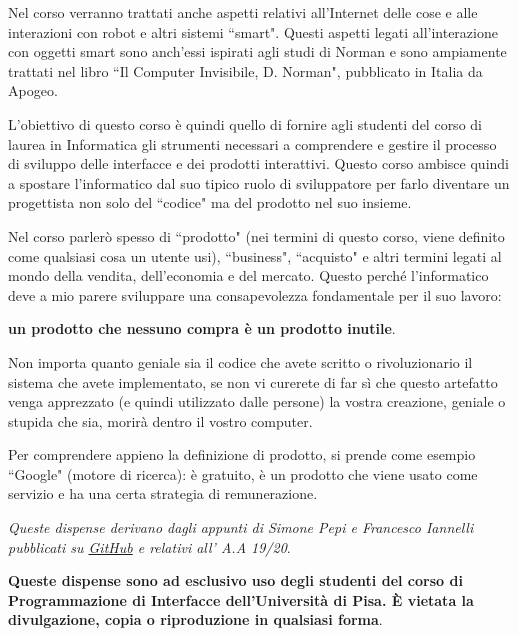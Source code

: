 Nel corso verranno trattati anche aspetti relativi all'Internet delle cose e alle interazioni con robot e altri sistemi ``smart". Questi aspetti
legati all'interazione con oggetti smart sono anch'essi ispirati agli studi di Norman e sono ampiamente trattati nel libro
``Il Computer Invisibile, D. Norman", pubblicato in Italia da Apogeo.

L'obiettivo di questo corso \`e quindi quello di fornire agli studenti del corso di laurea in Informatica gli strumenti necessari a comprendere e
gestire il processo di sviluppo delle interfacce e dei prodotti interattivi. Questo corso ambisce quindi a spostare l'informatico dal suo tipico
ruolo di sviluppatore per farlo diventare un progettista non solo del ``codice" ma del prodotto nel suo insieme.

Nel corso parler\`o spesso di ``prodotto" (nei termini di questo corso, viene definito come qualsiasi cosa un utente usi), ``business",
``acquisto" e altri termini legati al mondo della vendita, dell'economia e del mercato. Questo perch\'e l'informatico deve a mio parere sviluppare
una consapevolezza fondamentale per il suo lavoro:

\vspace{\baselineskip}
\textbf{un prodotto che nessuno compra \`e un prodotto inutile}.
\vspace{\baselineskip}

Non importa quanto geniale sia il codice che avete scritto o rivoluzionario il sistema che avete implementato, se non vi curerete di far s\`i che questo
artefatto venga apprezzato (e quindi utilizzato dalle persone) la vostra creazione, geniale o stupida che sia, morir\`a dentro il vostro computer.

Per comprendere appieno la definizione di prodotto, si prende come esempio ``Google" (motore di ricerca): \`e gratuito, \`e un prodotto che viene
usato come servizio e ha una certa strategia di remunerazione.

\vfill
\textit{Queste dispense derivano dagli appunti di Simone Pepi e Francesco Iannelli pubblicati su \href{https://github.com/unipi-notes/HMI_Notes-2019-20}
{GitHub} e relativi all' A.A 19/20}.

\textbf{Queste dispense sono ad esclusivo uso degli studenti del corso di Programmazione di Interfacce dell'Universit\`a di Pisa. \`E
vietata la divulgazione, copia o riproduzione in qualsiasi forma}.
